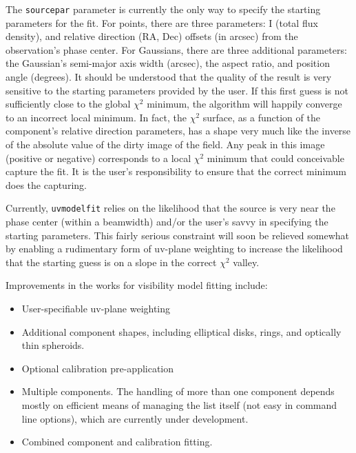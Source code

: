 The {\tt sourcepar} parameter is currently the only way to specify the
starting parameters for the fit.  For points, there are three
parameters: I (total flux density), and relative direction (RA, Dec)
offsets (in arcsec) from the observation's phase center.  For
Gaussians, there are three additional parameters: the Gaussian's
semi-major axis width (arcsec), the aspect ratio, and position angle
(degrees).  It should be understood that the quality of the result is
very sensitive to the starting parameters provided by the user.  If
this first guess is not sufficiently close to the global $\chi^2$
minimum, the algorithm will happily converge to an incorrect local
minimum.  In fact, the $\chi^2$ surface, as a function of the
component's relative direction parameters, has a shape very much like
the inverse of the absolute value of the dirty image of the field.
Any peak in this image (positive or negative) corresponds to a local
$\chi^2$ minimum that could conceivable capture the fit.  It is the
user's responsibility to ensure that the correct minimum does the
capturing.

Currently, {\tt uvmodelfit} relies on the likelihood that the source
is very near the phase center (within a beamwidth) and/or the user's
savvy in specifying the starting parameters.  This fairly serious
constraint will soon be relieved somewhat by enabling a rudimentary
form of uv-plane weighting to increase the likelihood that the
starting guess is on a slope in the correct $\chi^2$ valley.

Improvements in the works for visibility model fitting include:

\begin{itemize}
   \item User-specifiable uv-plane weighting
   \item Additional component shapes, including elliptical disks, rings,
         and optically thin spheroids.
   \item Optional calibration pre-application
   \item Multiple components.  The handling of more than one component
         depends mostly on efficient means of managing the list itself (not easy in
         command line options), which are currently under development.
   \item Combined component and calibration fitting.
\end{itemize}


